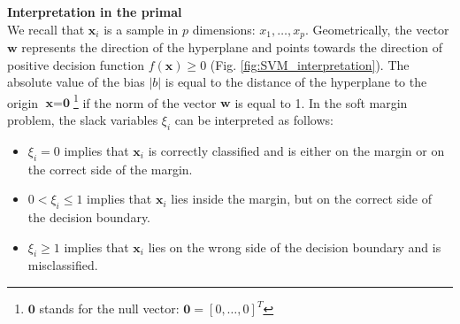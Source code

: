 %
%


\noindent \textbf{Interpretation in the primal} \\
We recall that $\textbf{x}_i$ is a sample in $p$ dimensions: $x_1, \ldots, x_p$. Geometrically, the vector $\textbf{w}$ represents the direction of the hyperplane and points towards the direction of positive decision function $f(\textbf{x}) \geq 0$ (Fig. \ref{fig:SVM_interpretation}). The absolute value of the bias $|b|$ is equal to the distance of the hyperplane to the origin $\textbf{x}=\textbf{0}$\footnote{$\textbf{0}$ stands for the null vector: $\textbf{0} = [0, \ldots ,0]^T$} if the norm of the vector $\textbf{w}$ is equal to 1. In the soft margin problem, the slack variables $\xi_i$ can be interpreted as follows:
\begin{itemize}
	\item $\xi_i = 0$ implies that $\textbf{x}_i$ is correctly classified and is either on the margin or on the correct side of the margin.
	\item $0 < \xi_i \leq 1$ implies that $\textbf{x}_i$ lies inside the margin, but on the correct side of the decision boundary.
	\item $\xi_i \geq 1$ implies that $\textbf{x}_i$ lies on the wrong side of the decision boundary and is misclassified.
\end{itemize}

